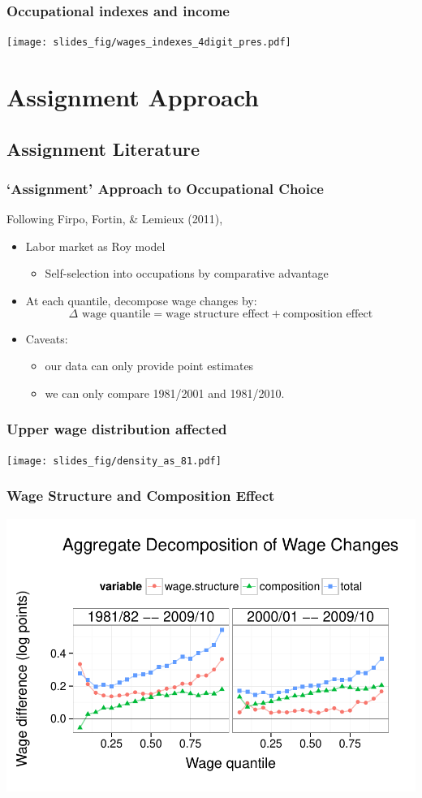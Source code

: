 \documentclass[red]{beamer}
\newcommand{\vitem}{\vfill\item}
\begin{document}
\begin{frame}[c]
  \frametitle{Occupational indexes and income}
\begin{center}
\texttt{[image: slides\_fig/wages\_indexes\_4digit\_pres.pdf]}
\end{center}
\end{frame}

\section{Assignment Approach}
\subsection{Assignment Literature}
\begin{frame}
  \frametitle{`Assignment' Approach to Occupational Choice}
  Following Firpo, Fortin, \& Lemieux (2011),
  \begin{itemize}
  \vitem Labor market as Roy model
    \begin{itemize}
    \item Self-selection into occupations by comparative advantage
    \end{itemize}
    \pause
  \vitem At each quantile, decompose wage changes by:
    \[ \Delta \text{ wage quantile} = \text{wage structure effect} + \text{composition effect} \]
  \vitem Caveats:
  \begin{itemize}
  \item our data can only provide point estimates
  \item we can only compare 1981/2001 and 1981/2010.
  \end{itemize}
\end{itemize}
\end{frame}

\begin{frame}[c]
\frametitle{Upper wage distribution affected}
\begin{center}
  \texttt{[image: slides\_fig/density\_as\_81.pdf]}
\end{center}
\end{frame}

\begin{frame}[c]
  \frametitle{Wage Structure and Composition Effect}
  \includegraphics[width=\textwidth]{../figure/aggregate_decomp.pdf}
\end{frame}
\end{document}
